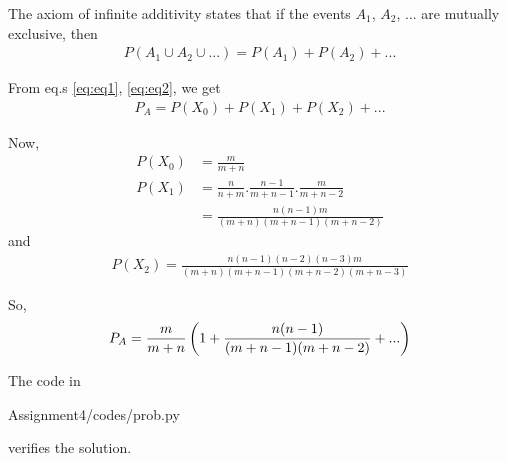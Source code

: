 \documentclass{beamer}
\begin{document}
\begin{frame}

The axiom of infinite additivity states that if the events $A_1$, $A_2$, ... are mutually exclusive, then
\begin{align}
P(A_1 \cup A_2 \cup ...) = P(A_1) + P(A_2) + ... \label{eq:eq2}
\end{align}

From eq.s \eqref{eq:eq1}, \eqref{eq:eq2}, we get
\begin{align}
P_A = P(X_0) + P(X_1) + P(X_2) + ...
\end{align}

Now,
\begin{align}
P(X_0) &= \frac{m}{m + n} \\
P(X_1) &= \frac{n}{n + m} . \frac{n - 1}{m + n - 1} . \frac{m}{m + n - 2} \\
&= \frac{n(n - 1)m}{(m + n)(m + n - 1)(m + n - 2)}
\end{align}
and
\begin{align}
P(X_2) = \frac{n(n - 1)(n - 2)(n - 3)m}{(m + n)(m + n - 1)(m + n - 2)(m + n - 3)}
\end{align}

\end{frame}

\begin{frame}
So,
\begin{align}
P_A = \frac{m}{m + n} \left(1 + \frac{n(n - 1)}{(m + n - 1)(m + n - 2)} + ...\right)
\end{align}

The code in
\begin{block}{}
Assignment4/codes/prob.py
\end{block}
verifies the solution.

\end{frame}
\end{document}
